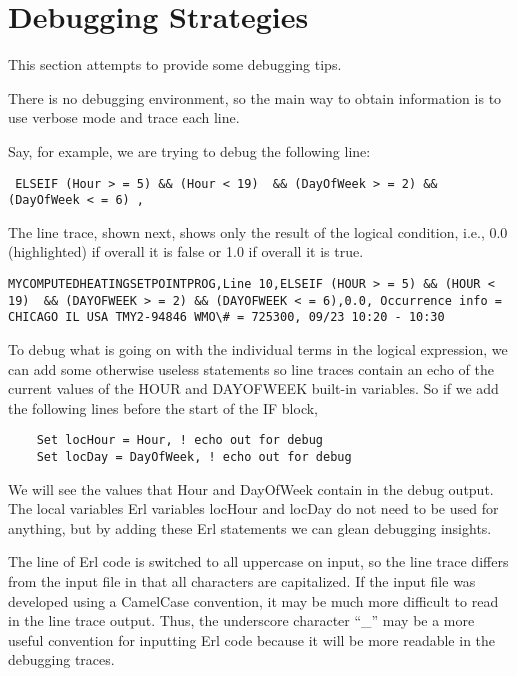\section{Debugging Strategies}\label{debugging-strategies}

This section attempts to provide some debugging tips.

There is no debugging environment, so the main way to obtain information is to use verbose mode and trace each line.

Say, for example, we are trying to debug the following line:

\begin{lstlisting}
 ELSEIF (Hour > = 5) && (Hour < 19)  && (DayOfWeek > = 2) && (DayOfWeek < = 6) ,
\end{lstlisting}

The line trace, shown next, shows only the result of the logical condition, i.e., 0.0 (highlighted) if overall it is false or 1.0 if overall it is true.

\begin{lstlisting}
MYCOMPUTEDHEATINGSETPOINTPROG,Line 10,ELSEIF (HOUR > = 5) && (HOUR < 19)  && (DAYOFWEEK > = 2) && (DAYOFWEEK < = 6),0.0, Occurrence info = CHICAGO IL USA TMY2-94846 WMO\# = 725300, 09/23 10:20 - 10:30
\end{lstlisting}

To debug what is going on with the individual terms in the logical expression, we can add some otherwise useless statements so line traces contain an echo of the current values of the HOUR and DAYOFWEEK built-in variables. So if we add the following lines before the start of the IF block,

\begin{lstlisting}
    Set locHour = Hour, ! echo out for debug
    Set locDay = DayOfWeek, ! echo out for debug
\end{lstlisting}

We will see the values that Hour and DayOfWeek contain in the debug output. The local variables Erl variables locHour and locDay do not need to be used for anything, but by adding these Erl statements we can glean debugging insights.

The line of Erl code is switched to all uppercase on input, so the line trace differs from the input file in that all characters are capitalized. If the input file was developed using a CamelCase convention, it may be much more difficult to read in the line trace output. Thus, the underscore character ``\_'' may be a more useful convention for inputting Erl code because it will be more readable in the debugging traces.
